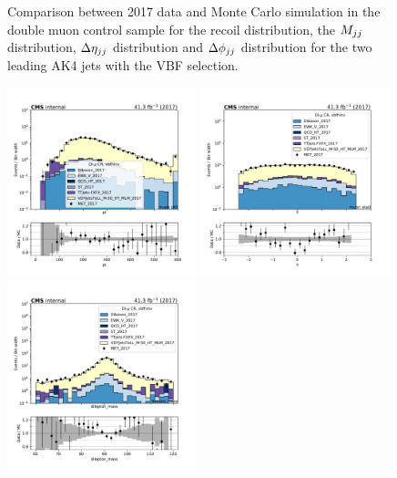 \begin{figure}[htbp]
\begin{center}
    \end{center}
    \caption{Comparison between 2017 data and Monte Carlo simulation in the double muon control sample for
        the recoil distribution, the $M_{jj}$ distribution, $\Delta \eta_{jj}$ distribution and
        $\Delta \phi_{jj}$ distribution for the two leading AK4 jets with the VBF selection.}
    \label{fig:DM_vbfhinv_2017}
\end{figure}

\begin{figure}[htbp]
    \begin{center}
        \includegraphics[width=0.49\textwidth]{fig/datamc/cr_2m_vbf/cr_2m_vbf_muon_pt0_losf_2017.pdf}
        \includegraphics[width=0.49\textwidth]{fig/datamc/cr_2m_vbf/cr_2m_vbf_muon_eta0_losf_2017.pdf} \\
        \includegraphics[width=0.49\textwidth]{fig/datamc/cr_2m_vbf/cr_2m_vbf_dimuon_mass_losf_2017.pdf}

\end{center}
\end{figure}
